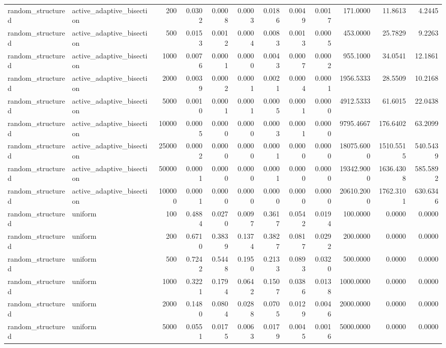 \begin{tabular}{llrrrrrrrrrr}
random_structured & active_adaptive_bisection & 200 & 0.0302 & 0.0008 & 0.0003 & 0.0186 & 0.0049 & 0.0017 & 171.0000 & 11.8613 & 4.2445 \\
random_structured & active_adaptive_bisection & 500 & 0.0153 & 0.0012 & 0.0004 & 0.0083 & 0.0013 & 0.0005 & 453.0000 & 25.7829 & 9.2263 \\
random_structured & active_adaptive_bisection & 1000 & 0.0076 & 0.0001 & 0.0000 & 0.0043 & 0.0007 & 0.0002 & 955.1000 & 34.0541 & 12.1861 \\
random_structured & active_adaptive_bisection & 2000 & 0.0039 & 0.0002 & 0.0001 & 0.0021 & 0.0004 & 0.0001 & 1956.5333 & 28.5509 & 10.2168 \\
random_structured & active_adaptive_bisection & 5000 & 0.0010 & 0.0001 & 0.0001 & 0.0005 & 0.0001 & 0.0000 & 4912.5333 & 61.6015 & 22.0438 \\
random_structured & active_adaptive_bisection & 10000 & 0.0005 & 0.0000 & 0.0000 & 0.0003 & 0.0001 & 0.0000 & 9795.4667 & 176.6402 & 63.2099 \\
random_structured & active_adaptive_bisection & 25000 & 0.0002 & 0.0000 & 0.0000 & 0.0001 & 0.0000 & 0.0000 & 18075.6000 & 1510.5515 & 540.5439 \\
random_structured & active_adaptive_bisection & 50000 & 0.0001 & 0.0000 & 0.0000 & 0.0001 & 0.0000 & 0.0000 & 19342.9000 & 1636.4308 & 585.5892 \\
random_structured & active_adaptive_bisection & 100000 & 0.0001 & 0.0000 & 0.0000 & 0.0000 & 0.0000 & 0.0000 & 20610.2000 & 1762.3101 & 630.6346 \\
random_structured & uniform & 100 & 0.4884 & 0.0270 & 0.0097 & 0.3617 & 0.0542 & 0.0194 & 100.0000 & 0.0000 & 0.0000 \\
random_structured & uniform & 200 & 0.6710 & 0.3839 & 0.1374 & 0.3827 & 0.0817 & 0.0292 & 200.0000 & 0.0000 & 0.0000 \\
random_structured & uniform & 500 & 0.7242 & 0.5448 & 0.1950 & 0.2133 & 0.0893 & 0.0320 & 500.0000 & 0.0000 & 0.0000 \\
random_structured & uniform & 1000 & 0.3221 & 0.1794 & 0.0642 & 0.1507 & 0.0386 & 0.0138 & 1000.0000 & 0.0000 & 0.0000 \\
random_structured & uniform & 2000 & 0.1480 & 0.0804 & 0.0288 & 0.0705 & 0.0129 & 0.0046 & 2000.0000 & 0.0000 & 0.0000 \\
random_structured & uniform & 5000 & 0.0551 & 0.0175 & 0.0063 & 0.0179 & 0.0045 & 0.0016 & 5000.0000 & 0.0000 & 0.0000 \\

\end{tabular}
